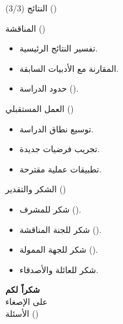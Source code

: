 \documentclass[aspectratio=169]{beamer}
\begin{document}
\begin{frame}{النتائج (3/3) ()}
\centering
{}
\end{frame}

\begin{frame}{المناقشة ()}
\begin{itemize}
    \item تفسير النتائج الرئيسية.
    \item المقارنة مع الأدبيات السابقة.
    \item حدود الدراسة ().
\end{itemize}
\end{frame}

\begin{frame}{العمل المستقبلي ()}
\begin{itemize}
    \item توسيع نطاق الدراسة.
    \item تجريب فرضيات جديدة.
    \item تطبيقات عملية مقترحة.
\end{itemize}
\end{frame}

\begin{frame}{الشكر والتقدير ()}
\begin{itemize}
    \item شكر للمشرف ().
    \item شكر للجنة المناقشة ().
    \item شكر للجهة الممولة ().
    \item شكر للعائلة والأصدقاء.
\end{itemize}
\end{frame}

\begin{frame}[plain]
\centering
\vspace{2em}
{\Huge\bfseries شكراً لكم}\\[1em]
{\Large على الإصغاء}\\[2em]
{\normalsize الأسئلة ()}
\end{frame}
\end{document}

